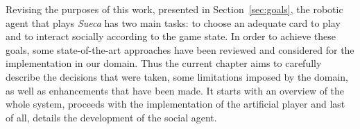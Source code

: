 \label{chapter:sueca-player}

Revising the purposes of this work, presented in Section~\ref{sec:goals}, the robotic agent that plays \emph{Sueca} has two main tasks: to choose an adequate card to play and to interact socially according to the game state.
In order to achieve these goals, some state-of-the-art approaches have been reviewed and considered for the implementation in our domain.
Thus the current chapter aims to carefully describe the decisions that were taken, some limitations imposed by the domain, as well as enhancements that have been made.
It starts with an overview of the whole system, proceeds with the implementation of the artificial player and last of all, details the development of the social agent.




\clearpage

